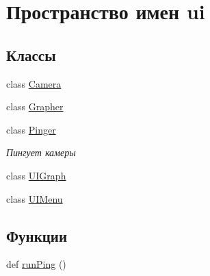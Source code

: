 \hypertarget{namespaceui}{}\section{Пространство имен ui}
\label{namespaceui}
\subsection*{Классы}
\begin{DoxyCompactItemize}
\item 
class \hyperlink{classui_1_1_camera}{Camera}
\item 
class \hyperlink{classui_1_1_grapher}{Grapher}
\item 
class \hyperlink{classui_1_1_pinger}{Pinger}
\begin{DoxyCompactList}\small\item\em Пингует камеры \end{DoxyCompactList}\item 
class \hyperlink{classui_1_1_u_i_graph}{U\+I\+Graph}
\item 
class \hyperlink{classui_1_1_u_i_menu}{U\+I\+Menu}
\end{DoxyCompactItemize}
\subsection*{Функции}
\begin{DoxyCompactItemize}
\item 
def \hyperlink{namespaceui_ad062c21e9583db1aef2026bda2bfd294}{run\+Ping} ()
\end{DoxyCompactItemize}
